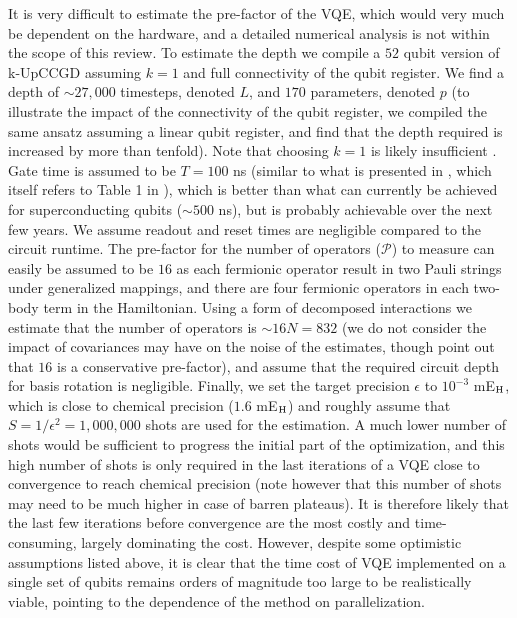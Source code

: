 It is very difficult to estimate the pre-factor of the VQE, which would very much be dependent on the hardware, and a detailed numerical analysis is not within the scope of this review. To estimate the depth we compile a $52$ qubit version of k-UpCCGD assuming $k=1$ and full connectivity of the qubit register. We find a depth of $\sim 27,000$ timesteps, denoted $L$, and $170$ parameters, denoted $p$ (to illustrate the impact of the connectivity of the qubit register, we compiled the same ansatz assuming a linear qubit register, and find that the depth required is increased by more than tenfold). Note that choosing $k=1$ is likely insufficient \cite{Lee2019, Grimsley2019_UCC_Review}. Gate time is assumed to be $T = 100$ ns (similar to what is presented in \cite{Gonthier2020}, which itself refers to Table 1 in \cite{Kjaergaard2020}), which is better than what can  currently be achieved for superconducting qubits ($\sim 500$ ns), but is probably achievable over the next few years. We assume readout and reset times are negligible compared to the circuit runtime. The pre-factor for the number of operators ($\mathcal{P}$) to measure can easily be assumed to be $16$ as each fermionic operator result in two Pauli strings under generalized mappings, and there are four fermionic operators in each two-body term in the Hamiltonian. Using a form of decomposed interactions we estimate that the number of operators is $\sim 16N = 832$ (we do not consider the impact of covariances may have on the noise of the estimates, though point out that $16$ is a conservative pre-factor), and assume that the required circuit depth for basis rotation is negligible. Finally, we set the target precision $\epsilon$ to $10^{-3}$ mE$_{\rm H}$, which is close to chemical precision ($1.6$ mE$_{\rm H}$) \cite{Peterson2012} and roughly assume that $S = 1/\epsilon^2=1,000,000$ shots are used for the estimation. A much lower number of shots would be sufficient to progress the initial part of the optimization, and this high number of shots is only required in the last iterations of a VQE close to convergence to reach chemical precision (note however that this number of shots may need to be much higher in case of barren plateaus). It is therefore likely that the last few iterations before convergence are the most costly and time-consuming, largely dominating the cost. However, despite some optimistic assumptions listed above, it is clear that the time cost of VQE implemented on a single set of qubits remains orders of magnitude too large to be realistically viable, pointing to the dependence of the method on parallelization. 

